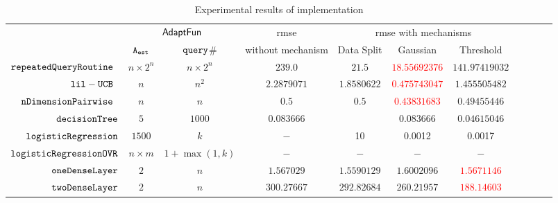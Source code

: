 {\footnotesize
\begin {table}[H]
\vspace{-0.4cm}
    \caption{Experimental results of {\THESYSTEM} implementation}
    \vspace{-0.5cm}
        \label{tb:adapt-imp}
        \begin{center}
        \centering
{\tiny
        \begin{tabular}{| >{\tiny}r | c | c | c | c | c | c | c | c | c | c  }
         \hline \hline
        \multirow{2}{*}{Program $c$}
         & \multicolumn{2}{c|}{$\textsf{AdaptFun}$}
         & {rmse}
         & \multicolumn{3}{c|}{rmse with mechanisms} \\ 
         \cline{2-3} \cline{5-7}
         & {${\mathtt{A_{est}}}$ } & {${\tt query}$\# } &  without mechanism & Data Split & Gaussian & Threshold  \\ 
         \cline{6-7}
         \hline \hline
         $  \mathtt{repeatedQueryRoutine}$~\cite{Jamieson2015TheAO} & $ n \times 2^n $ & $  n \times 2^n $ & $239.0$   & $21.5$ & \textcolor{red}{$18.55692376$} & $141.97419032$  \\
         $  \mathtt{lil-UCB}$~\cite{Jamieson2015TheAO} & $ n $ & $  n^2 $ & $ 2.2879071$   & $ 1.8580622$ & \textcolor{red}{$0.475743047$} & $ 1.455505482 $  \\
         $  \mathtt{nDimensionPairwise}$~\cite{Jamieson2015TheAO} & $ n $ & $  n  $ & $0.5$   & $0.5$ & \textcolor{red}{$ 0.43831683 $} & $ 0.49455446 $  \\
         $  \mathtt{decisionTree}$ & $5$ &  $1000$ & $0.083666$  & $  $ & $0.083666$ &$0.04615046$  \\
         $  \mathtt{logisticRegression}$ & $1500$ &  $k$ & $-$  &  10 & 0.0012 & 0.0017   \\
         $  \mathtt{logisticRegressionOVR}$    & $n\times m$ &  $1+ \max(1, k) $ &  $ -  $  &  $-$ & $-$ & $-$ \\
         $  \mathtt{oneDenseLayer}$ & $2$   & $ n $   &  $ 1.567029  $  &  {$ 1.5590129 $} & $1.6002096$ & \textcolor{red}{$ 1.5671146 $}  \\
         {$ \mathtt{twoDenseLayer}$} & $2$ &  $ n $ &  $ 300.27667 $  &  $ 292.82684 $ & $ 260.21957 $ & \textcolor{red}{$ 188.14603 $}  \\

\end{tabular}}
\end{center}
\end{table}}
